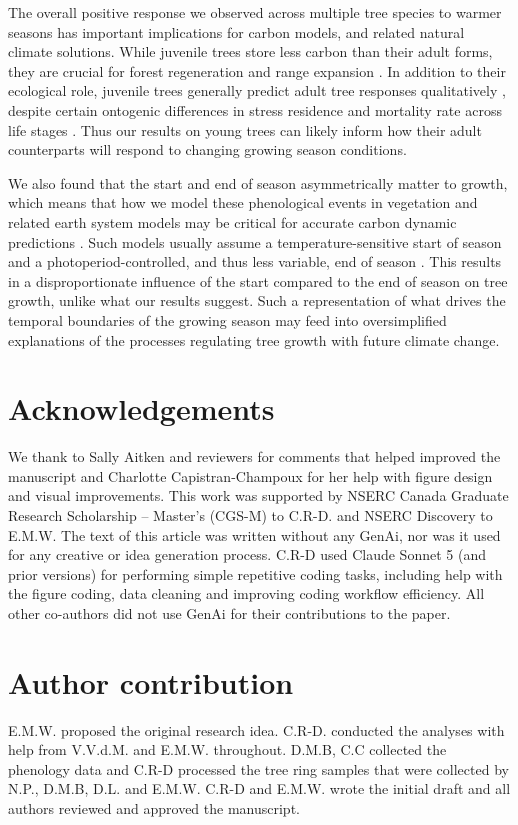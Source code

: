 \documentclass{article}\usepackage[]{graphicx}\usepackage[]{xcolor}
\begin{document}
The overall positive response we observed across multiple tree species to warmer seasons has important implications for carbon models, and related natural climate solutions. While juvenile trees store less carbon than their adult forms, they are crucial for forest regeneration and range expansion \citep[as discussed above, and see][]{luu_importance_2024}. In addition to their ecological role, juvenile trees generally predict adult tree responses qualitatively \citep{augspurger_differences_2003,wolkovich_why_2025}, despite certain ontogenic differences in stress residence and mortality rate across life stages \citep{caron_thermal_2021}. Thus our results on young trees can likely inform how their adult counterparts will respond to changing growing season conditions.

We also found that the start and end of season asymmetrically matter to growth, which means that how we model these phenological events in vegetation and related earth system models may be critical for accurate carbon dynamic predictions \citep{li_comparison_2022}. Such models usually assume a temperature-sensitive start of season and a photoperiod-controlled, and thus less variable, end of season \citep{chen_comparison_2022,melaas_multiscale_2016}. This results in a disproportionate influence of the start compared to the end of season on tree growth, unlike what our results suggest. Such a representation of what drives the temporal boundaries of the growing season may feed into oversimplified explanations of the processes regulating tree growth with future climate change. 

\section*{Acknowledgements}
We thank to Sally Aitken and reviewers for comments that helped improved the manuscript and Charlotte Capistran-Champoux for her help with figure design and visual improvements. This work was supported by NSERC Canada Graduate Research Scholarship – Master’s (CGS-M) to C.R-D. and NSERC Discovery to E.M.W. The text of this article was written without any GenAi, nor was it used for any creative or idea generation process. C.R-D used Claude Sonnet 5 (and prior versions) for performing simple repetitive coding tasks, including help with the figure coding, data cleaning and improving coding workflow efficiency. All other co-authors did not use GenAi for their contributions to the paper.

\section*{Author contribution}
E.M.W. proposed the original research idea. C.R-D. conducted the analyses with help from V.V.d.M. and E.M.W. throughout. D.M.B, C.C collected the phenology data and C.R-D processed the tree ring samples that were collected by N.P., D.M.B, D.L. and E.M.W. C.R-D and E.M.W. wrote the initial draft and all authors reviewed and approved the manuscript.
\end{document}
